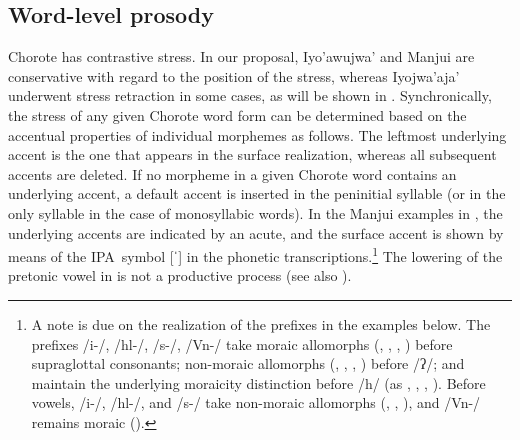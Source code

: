\subsection{Word-level prosody}\label{ch-prosody}

Chorote has contrastive stress. In our proposal, Iyo’awujwa’ and Manjui are conservative with regard to the position of the stress, whereas Iyojwa’aja’ underwent stress retraction in some cases, as will be shown in . Synchronically, the stress of any given Chorote word form can be determined based on the accentual properties of individual morphemes as follows. The leftmost underlying accent is the one that appears in the surface realization, whereas all subsequent accents are deleted. If no morpheme in a given Chorote word contains an underlying accent, a default accent is inserted in the peninitial syllable (or in the only syllable in the case of monosyllabic words). In the Manjui examples in , the underlying accents are indicated by an acute, and the surface accent is shown by means of the IPA~symbol [ˈ] in the phonetic transcriptions.\footnote{A note is due on the realization of the prefixes in the examples below. The prefixes /i\mbox{-}/, /hl\mbox{-}/, /s\mbox{-}/, /Vn\mbox{-}/ take moraic allomorphs (, , , ) before supraglottal consonants; non-moraic allomorphs (, , , ) before /ʔ/; and maintain the underlying moraicity distinction before /h/ (as , , , ). Before vowels, /i\mbox{-}/, /hl\mbox{-}/, and /s\mbox{-}/ take non-moraic allomorphs (, , ), and /Vn\mbox{-}/ remains moraic ().} The lowering of the pretonic vowel in  is not a productive process (see also ).

